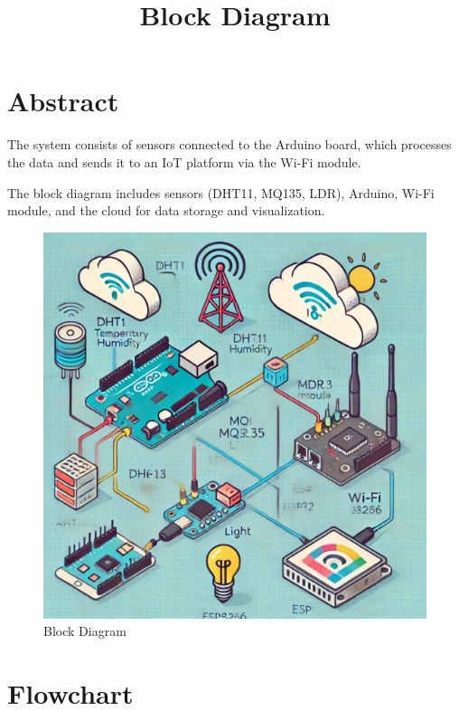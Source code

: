 \documentclass[12pt]{report}
\begin{document}
	
	\vspace{0.5cm}
	\section*{Abstract}
	The system consists of sensors connected to the Arduino board, which processes the data and sends it to an IoT platform via the Wi-Fi module.\\
	
	\vspace*{0.5cm}
	\title{\large Block Diagram\\}
	The block diagram includes sensors (DHT11, MQ135, LDR), Arduino, Wi-Fi module, and the
	cloud for data storage and visualization.\\
	
	\clearpage
	\begin{figure}[h]
		\centering
		\includegraphics[scale=1]{blockdiagram.jpg}
		\caption[block_fig]{Block Diagram}
		\label{block_fig}
	\end{figure}
	
	
	\section*{Flowchart}
\end{document}
